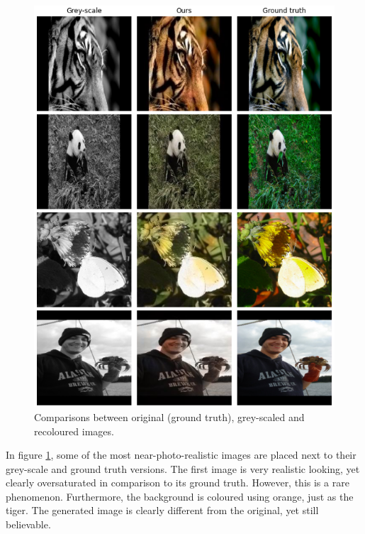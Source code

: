 \documentclass{article}
\begin{document}
        \begin{figure}[H]
            \centering
            \includegraphics[width=\textwidth]{img/example.png}
            \caption{Comparisons between original (ground truth), grey-scaled and recoloured images.}
            \label{fig:recol1}
        \end{figure}
        
        In figure \ref{fig:recol1}, some of the most near-photo-realistic images are placed next to their grey-scale and ground truth versions. The first image is very realistic looking, yet clearly oversaturated in comparison to its ground truth. However, this is a rare phenomenon. Furthermore, the background is coloured using orange, just as the tiger. The generated image is clearly different from the original, yet still believable. 
        
\end{document}
